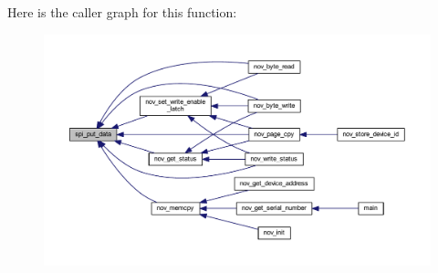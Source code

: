Here is the caller graph for this function\+:\nopagebreak
\begin{figure}[H]
\begin{center}
\leavevmode
\includegraphics[width=350pt]{da/d45/a00011_a19e2dff580e4d1b2198fa9108fca81ac_icgraph}
\end{center}
\end{figure}



